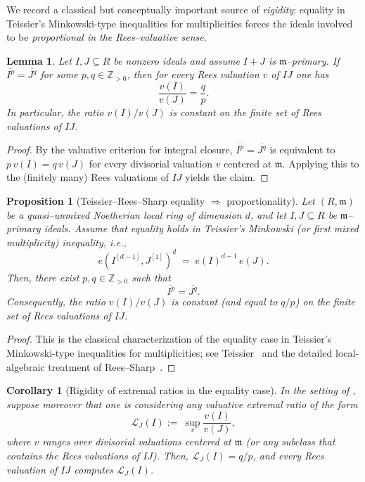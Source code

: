 \documentclass[12pt]{amsart}
\newcommand{\m}{\mathfrak m}
\newcommand{\Loj}{\mathcal{L}} %
\theoremstyle{plain}
\newtheorem{proposition}[theorem]{Proposition}
\newtheorem{lemma}[theorem]{Lemma}
\newtheorem{corollary}[theorem]{Corollary}
\theoremstyle{definition}
\numberwithin{equation}{section}
\begin{document}
We record a classical but conceptually important source of
\emph{rigidity}: equality in Teissier's Minkowski-type inequalities for
multiplicities forces the ideals involved to be \emph{proportional in the
	Rees--valuative sense}. 

\begin{lemma}\label{lem:IC-powers-ree}
	Let $I,J\subseteq R$ be nonzero ideals and assume $I+J$ is $\m$--primary.
	If $\overline{I^p}=\overline{J^q}$ for some $p,q\in \mathbb{Z}_{>0}$, then for
	every Rees valuation $v$ of $IJ$ one has
	\[
	\frac{v(I)}{v(J)}=\frac{q}{p}.
	\]
	In particular, the ratio $v(I)/v(J)$ is constant on the finite set of Rees
	valuations of $IJ$.
\end{lemma}

\begin{proof}
	By the valuative criterion for integral closure, $\overline{I^p}=\overline{J^q}$
	is equivalent to $p\,v(I)=q\,v(J)$ for every divisorial valuation $v$ centered at
	$\m$. Applying this to the (finitely many) Rees valuations of $IJ$ yields the
	claim.
\end{proof}

\begin{proposition}[Teissier--Rees--Sharp equality $\Rightarrow$ proportionality]\label{prop:TRS-equality-proportionality}
	Let $(R,\m)$ be a quasi--unmixed Noetherian local ring of dimension $d$, and let
	$I,J\subseteq R$ be $\m$--primary ideals.
	Assume that equality holds in Teissier's Minkowski (or first mixed multiplicity)
	inequality, i.e.,
	\[
	e\!\left(I^{[d-1]},J^{[1]}\right)^d \;=\; e(I)^{d-1}\,e(J).
	\]
	Then, there exist $p,q\in\mathbb{Z}_{>0}$ such that
	\[
	\overline{I^p}=\overline{J^q}.
	\]
	Consequently, the ratio $v(I)/v(J)$ is constant
	(and equal to $q/p$) on the finite set of Rees valuations of $IJ$.
\end{proposition}

\begin{proof}
	This is the classical characterization of the equality case in Teissier's
	Minkowski-type inequalities for multiplicities; see Teissier~\cite{Teissier77}
	and the detailed local-algebraic treatment of Rees--Sharp~\cite{ReesSharp78}.
\end{proof}

\begin{corollary}[Rigidity of extremal ratios in the equality case]\label{cor:rigidity-extremal-ratio-TRS}
	In the setting of , suppose
	moreover that one is considering any valuative extremal ratio of the form
	\[
	\Loj_{J}(I) :=\ \sup_{v}\frac{v(I)}{v(J)},
	\]
	where $v$ ranges over divisorial valuations centered at $\m$ (or any subclass
	that contains the Rees valuations of $IJ$).
	Then, $\Loj_J(I)=q/p$, and every Rees valuation of $IJ$ computes
	$\Loj_J(I)$.
\end{corollary}
\end{document}
